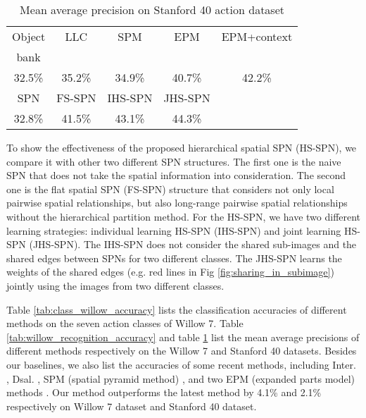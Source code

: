 \documentclass[journal]{IEEEtran}
\begin{document}
\begin{table}[h!]
		\caption{Mean average precision on Stanford 40 action dataset} 
	\begin{center}
		
		\begin{tabular}{c c c c c}
			\hline
			
			\hline
			Object & LLC & SPM  & EPM  & EPM+context \\
			bank \cite{obect_bank} & \cite{LLC} & \cite{Lazebnik_beyond_cvpr2006} & \cite{sharma:CVPR2013} & \cite{sharma:CVPR2013}\\
			\hline
			
			32.5\% & 35.2\% & 34.9\% & 40.7\% & 42.2\% \\ 
			\hline
			\hline
			
			\hline
			SPN & FS-SPN & IHS-SPN & JHS-SPN & \\ \hline 
			32.8\% & 41.5\% & 43.1\% & 44.3\% &  \\ \hline 
			
			\hline
			
		\end{tabular}
		
	\end{center}
	
  
	
	\label{tab:stanford_recognition_accuracy} 
\end{table}




To show the effectiveness of the proposed hierarchical spatial SPN (HS-SPN), we compare it with other two different SPN structures. The first one is the naive SPN that does not take the spatial information into consideration. The second one is the flat spatial SPN (FS-SPN) structure that considers not only local pairwise spatial relationships, but also long-range pairwise spatial relationships without the hierarchical partition method. For the HS-SPN, we have two different learning strategies: individual learning HS-SPN (IHS-SPN) and joint learning HS-SPN (JHS-SPN). The IHS-SPN does not consider the shared sub-images and the shared edges between SPNs for two different classes. The JHS-SPN learns the weights of the shared edges (e.g. red lines in Fig \ref{fig:sharing_in_subimage}) jointly using the images from two different classes.

Table \ref{tab:class_willow_accuracy} lists the classification accuracies of different methods on the seven action classes of Willow 7.
Table \ref{tab:willow_recognition_accuracy} and table \ref{tab:stanford_recognition_accuracy} list the mean average precisions of different methods respectively on the Willow 7 and Stanford 40 datasets. Besides our baselines, we also list the accuracies of some recent methods, including Inter. \cite{Delaitre11learningperson-object}, Dsal. \cite{sharma:CVPR2012_Discriminative}, SPM (spatial pyramid method) \cite{Lazebnik_beyond_cvpr2006}, and two EPM (expanded parts model) methods \cite{sharma:CVPR2013}. Our method outperforms the latest method \cite{sharma:CVPR2013} by 4.1\% and 2.1\% respectively on Willow 7 dataset and Stanford 40 dataset.
\end{document}
